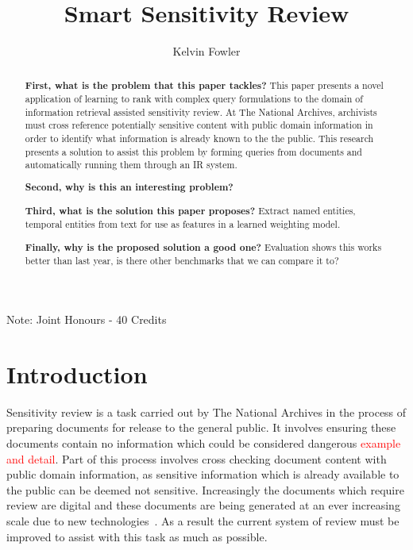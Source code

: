 \documentclass{mpaper}
\let\oldcite=\cite
\renewcommand\cite[1]{\ifthenelse{\equal{#1}{NEEDED}}{\ensuremath{^\texttt{[citation~needed]}}}{\oldcite{#1}}}
\newcommand{\remove}[1]{\textcolor{red}{#1}}
\begin{document}
\title{Smart Sensitivity Review}
\author{Kelvin Fowler}

\maketitle
\small{Note: Joint Honours - 40 Credits}

\begin{abstract}
\textbf{First, what is the problem that this paper tackles? }
This paper presents a novel application of learning to rank with complex query formulations to the domain of information retrieval assisted sensitivity review. At The National Archives, archivists must cross reference potentially sensitive content with public domain information in order to identify what information is already known to the the public.
This research presents a solution to assist this problem by forming queries from documents and automatically running them through an IR system.

\textbf{Second, why is this an interesting problem?}

\textbf{Third, what is the solution this paper proposes?}
Extract named entities, temporal entities from text for use as features in a learned weighting model.

\textbf{Finally, why is the proposed solution a good one?}
Evaluation shows this works better than last year, is there other benchmarks that we can compare it to?
\end{abstract}

\section{Introduction} \label{sec:intro}

Sensitivity review is a task carried out by The National Archives in the process of preparing documents for release to the general public. It involves ensuring these documents contain no information which could be considered dangerous \remove{example and detail}. Part of this process involves cross checking document content with public domain information, as sensitive information which is already available to the public can be deemed not sensitive. Increasingly the documents which require review are digital and these documents are being generated at an ever increasing scale due to new technologies~\cite{NEEDED}. As a result the current system of review must be improved to assist with this task as much as possible.
\end{document}
